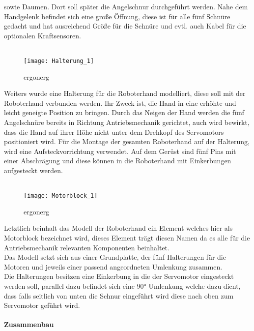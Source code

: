 \documentclass[titlepage,12pt,twoside]{article}
\begin{document}
sowie Daumen. Dort soll später die Angelschnur durchgeführt werden. Nahe dem 
Handgelenk befindet sich eine große Öffnung, diese ist für alle fünf Schnüre 
gedacht und hat ausreichend Größe für die Schnüre und evtl. auch Kabel für die 
optionalen Kraftsensoren. \\
\\
\begin{figure}[H]
	\begin{center}
		\scalebox{1}
		{\texttt{[image: Halterung\_1]}}
		\caption{ergonerg}
		\label{fig:Halterung_1}		
	\end{center}
\end{figure}
\hfill \break
Weiters wurde eine Halterung für die Roboterhand modelliert, diese soll mit 
der Roboterhand verbunden werden. Ihr Zweck ist, die Hand in eine erhöhte und 
leicht geneigte Position zu bringen. Durch das Neigen der Hand werden die fünf 
Angelschnüre bereits in Richtung Antriebsmechanik gerichtet, auch wird bewirkt, 
dass die Hand auf ihrer Höhe nicht unter dem Drehkopf des Servomotors positioniert 
wird. Für die Montage der gesamten Roboterhand auf der Halterung, wird eine 
Aufsteckvorrichtung verwendet. Auf dem Gerüst sind fünf Pins mit einer 
Abschrägung und diese können in die Roboterhand mit Einkerbungen aufgesteckt 
werden. \\
\\
\begin{figure}[H]
	\begin{center}
		\scalebox{1}
		{\texttt{[image: Motorblock\_1]}}
		\caption{ergonerg}
		\label{fig:Motorblock_1}			
	\end{center}
\end{figure}
\hfill \break
Letztlich beinhalt das Modell der Roboterhand ein Element welches hier als 
Motorblock bezeichnet wird, dieses Element trägt diesen Namen da es alle 
für die Antriebsmechanik relevanten Komponenten beinhaltet. \\
Das Modell setzt sich aus einer Grundplatte, der fünf Halterungen für die 
Motoren und jeweils einer passend angeordneten Umlenkung zusammen. \\
Die Halterungen besitzen eine Einkerbung in die der Servomotor eingesteckt 
werden soll, parallel dazu befindet sich eine 90° Umlenkung welche dazu dient, 
dass falls seitlich von unten die Schnur eingeführt wird diese nach oben zum 
Servomotor geführt wird. \\
\\
\textbf{Zusammenbau} \\
\end{document}
